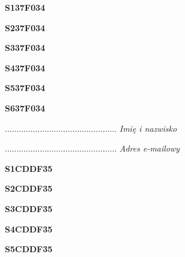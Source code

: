 \begin{turn}{90}\huge \textbf{S137F034}\end{turn}

\begin{turn}{90}\huge \textbf{S237F034}\end{turn}

\begin{turn}{90}\huge \textbf{S337F034}\end{turn}

\begin{turn}{90}\huge \textbf{S437F034}\end{turn}

\begin{turn}{90}\huge \textbf{S537F034}\end{turn}

\begin{turn}{90}\huge \textbf{S637F034}\end{turn}

\begin{turn}{90}\begin{minipage}{\linewidth} \vspace{20mm} ................................................  \textit{Imię i nazwisko}\end{minipage}\end{turn}

\begin{turn}{90}\begin{minipage}{\linewidth} \vspace{20mm} ................................................  \textit{Adres e-mailowy}\end{minipage}\end{turn}

\begin{turn}{90}\huge \textbf{S1CDDF35}\end{turn}

\begin{turn}{90}\huge \textbf{S2CDDF35}\end{turn}

\begin{turn}{90}\huge \textbf{S3CDDF35}\end{turn}

\begin{turn}{90}\huge \textbf{S4CDDF35}\end{turn}

\begin{turn}{90}\huge \textbf{S5CDDF35}\end{turn}

